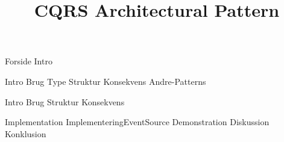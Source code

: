 \documentclass[a4paper,openany]{memoir}
\title{CQRS Architectural Pattern}
\begin{document}
	{Forside}  \newpage
	\tableofcontents\thispagestyle{fancy}  \newpage
	{Intro}  \newpage

	{Intro}
	{Brug}
	{Type}
	{Struktur}
	{Konsekvens}
	{Andre-Patterns}
	
	{Intro}
	{Brug}
	{Struktur}
	{Konsekvens}

	{Implementation}
	{ImplementeringEventSource}
	{Demonstration}
	{Diskussion}
	{Konklusion}\newpage

	\printbibliography
	\listoffixmes
	
\end{document}
